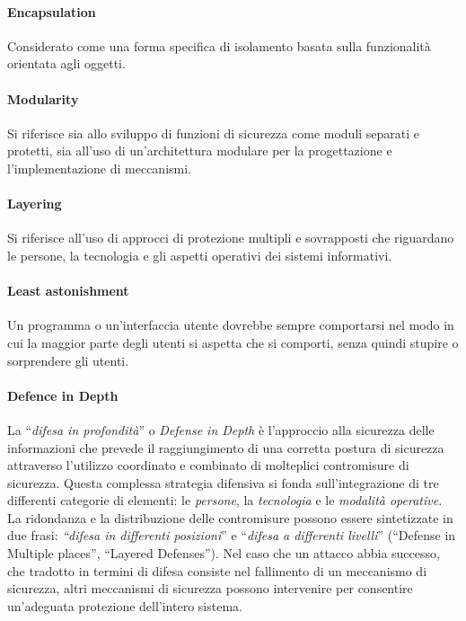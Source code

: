 \paragraph{Encapsulation}
Considerato come una forma specifica di isolamento basata sulla funzionalità
orientata agli oggetti.

\paragraph{Modularity}
Si riferisce sia allo sviluppo di funzioni di sicurezza come moduli separati e
protetti, sia all'uso di
un'architettura modulare per la progettazione e l'implementazione di meccanismi.

\paragraph{Layering}
Si riferisce all'uso di approcci di protezione multipli e sovrapposti che
riguardano le persone, la
tecnologia e gli aspetti operativi dei sistemi informativi.

\paragraph{Least astonishment}
Un programma o un'interfaccia utente dovrebbe sempre comportarsi nel modo in cui la maggior parte degli utenti si aspetta che si comporti, senza quindi stupire o sorprendere gli utenti.

\paragraph{Defence in Depth}
La ``\textit{difesa in profondità}'' o \textit{Defense in Depth} è
l'approccio alla sicurezza delle informazioni che
prevede il raggiungimento di una corretta postura di sicurezza attraverso
l'utilizzo coordinato e combinato di molteplici contromisure di sicurezza.
Questa complessa strategia difensiva si fonda sull'integrazione di tre differenti
categorie di elementi: le \textit{persone}, la \textit{tecnologia} e le
\textit{modalità operative}. La ridondanza e la distribuzione delle
contromisure possono essere sintetizzate in due
frasi: \textit{``difesa in differenti posizioni}'' e
``\textit{difesa a differenti livelli}''
(``Defense in Multiple places'', ``Layered Defenses'').
Nel caso che un attacco abbia successo, che tradotto in termini di difesa
consiste nel fallimento di un meccanismo di sicurezza, altri meccanismi di
sicurezza possono intervenire per consentire un'adeguata protezione dell'intero
sistema.

